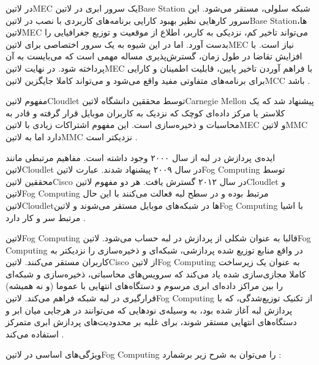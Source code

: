 در ‌لاتین{MEC} یک سرور ابری در ‌لاتین{Base Station} شبکه سلولی، مستقر می‌شود. این سرور کارهایی نظیر بهبود کارایی برنامه‌های کاربردی
با نصب در ‌لاتین{Base Station}ها، ‌لاتین{MEC} می‌تواند تاخیر کم، نزدیکی به کاربر، اطلاع از موقعیت و توزیع جغرافیایی را بدست آورد.
اما در این شیوه به یک سرور اختصاصی برای ‌لاتین{MEC} نیاز است.
با افزایش تقاضا در طول زمان، گسترش‌پذیری مساله مهمی است که می‌بایست به آن پرداخته شود.
در نهایت ‌لاتین{MEC} با فراهم آوردن تاخیر پایین، قابلیت اطمینان و کارایی برای برنامه‌های متفاوتی مفید واقع می‌شود و می‌تواند کاملا جایگزین ‌لاتین{MCC} باشد
.


مفهوم ‌لاتین{Cloudlet} توسط محققین دانشگاه ‌لاتین{Carnegie Mellon} پیشنهاد شد که یک کلاستر یا مرکز داده‌ای کوچک
که نزدیک به کاربران موبایل قرار گرفته و قادر به محاسبات و ذخیره‌سازی است.
این مفهوم اشتراکات زیادی با ‌لاتین{MEC} و ‌لاتین{MMC} دارد اما به ‌لاتین{MMC} نزدیکتر است
.


ایده‌ی پردازش در لبه از سال ۲۰۰۰ وجود داشته است. مفاهیم مرتبطی مانند ‌لاتین{Cloudlet} در سال ۲۰۰۹ پیشنهاد شدند.
عبارت ‌لاتین{Fog Computing} توسط محققین ‌لاتین{Cisco} در سال ۲۰۱۲ گسترش یافت.
هر دو مفهوم ‌لاتین{Cloudlet} و ‌لاتین{Fog Computing} مرتبط بوده و در سطح لبه فعالت می‌کنند با این حال
‌لاتین{Cloudlet}ها در شبکه‌های موبایل مستقر می‌شوند و ‌لاتین{Fog Computing} با اشیا مرتبط سر و کار دارد
.

‌لاتین{Fog Computing} قالبا به عنوان شکلی از پردازش در لبه حساب می‌شود.
‌لاتین{Fog Computing} در واقع منابع توزیع شده پردازشی، شبکه‌ای و ذخیره‌سازی را نزدیکتر به کاربران مستقر می‌کنند.
‌لاتین{Cisco} از ‌لاتین{Fog Computing} به عنوان یک زیرساخت کاملا مجازی‌سازی شده یاد می‌کند که سرویس‌های محاسباتی، ذخیره‌سازی و شبکه‌ای
را بین مراکز داده‌ای ابری مرسوم و دستگاه‌های انتهایی با عموما (و نه همیشه) قرارگیری در لبه شبکه فراهم می‌کند.
‌لاتین{Fog Computing} از تکنیک توزیع‌شدگی، که با پردازش لبه آغاز شده بود، به وسیله‌ی نودهایی که
می‌توانند در هرجایی میان ابر و دستگاه‌های انتهایی مستقر شوند،
برای غلبه بر محدودیت‌های پردازش ابری متمرکز استفاده می‌کند
.


ویژگی‌های اساسی در ‌لاتین{Fog Computing} را می‌توان به شرح زیر برشمارد
:

